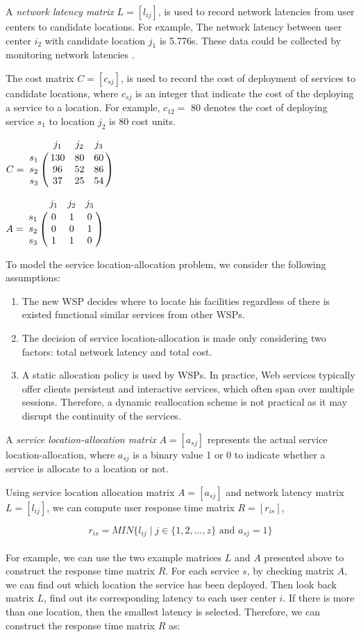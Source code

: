 \documentclass{llncs}
\let\bbordermatrix\bordermatrix
\begin{document}
A \emph{network latency matrix} $L = [l_{ij}]$, is used to record network latencies from user centers to 
candidate locations. For example, The network latency between user center $i_{2}$ with candidate location $j_{1}$ 
is 5.776s. These data could be collected by monitoring network latencies \cite{6076756} \cite{5552800}.

The cost matrix $C = [c_{sj}]$, is used to record the cost of deployment of services to candidate locations, 
where $c_{sj}$ is an integer that indicate the cost of the deploying a service to a location. 
For example, $c_{12} = $ 80 denotes the cost of deploying service $s_{1}$ to location $j_{2}$ is 80 cost units.

\parbox{.45\linewidth}{
{\centering
$
C = \bbordermatrix{~ & j_{1} & j_{2} & j_{3}\cr
					s_{1}	&130 &80 &60\cr
					s_{2}	&96  &52 &86\cr
					s_{3}	&37 &25 &54\cr}
$
\\}
}
\parbox{.45\linewidth}{
{\centering
$
A = \bbordermatrix{~ & j_{1} & j_{2} & j_{3}\cr
					s_{1}	&0 &1 &0	\cr
					s_{2}	&0  &0 &1	\cr
					s_{3}	&1 &1 &0	\cr}
$
\\}
}

To model the service location-allocation problem, we consider the following assumptions:
\begin{enumerate}
	\item The new WSP decides where to locate his facilities regardless of there is existed functional similar services from other WSPs.
	\item The decision of service location-allocation is made only considering two factors: total network latency and total cost.
	\item A static allocation policy is used by WSPs. In practice, Web services typically offer clients persistent and interactive services, which often span over multiple sessions. Therefore, a dynamic reallocation scheme is not practical as it may disrupt the continuity of the services.
\end{enumerate}


A \emph{service location-allocation matrix} $A = [a_{sj}]$ represents the actual service location-allocation, where $a_{sj}$  is a binary value 1 or 0 to indicate whether a service is allocate to a location or not.


Using service location allocation matrix $A = [a_{sj}]$ and network latency matrix $L = [l_{ij}]$, we can compute user
response time matrix $R = [r_{is}]$, 

{\centering
	\begin{equation}
		r_{is} = MIN\{l_{ij} \mid j \in \{1, 2, ..., z\} \text{ and } a_{sj} = 1\}
	\end{equation}
\\}
For example, we can use the two example matrices $L$ and $A$ presented above to construct the response time matrix $R$. 
For each service $s$, by checking matrix $A$, we can find out which location the service has been deployed.
Then look back matrix $L$, find out its corresponding latency to each user center $i$. If there is
more than one location, then the smallest latency is selected. Therefore, we can construct the response time matrix $R$ as:
\end{document}
